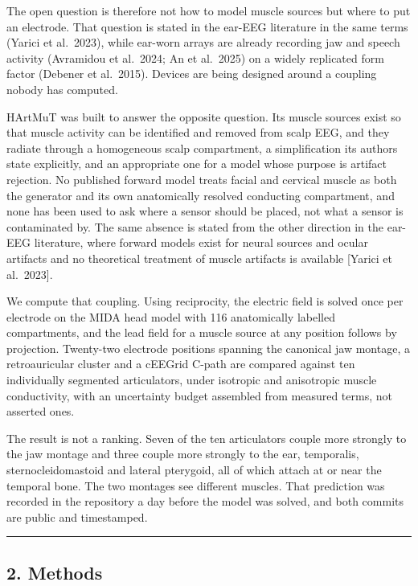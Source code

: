 \documentclass[
  11pt,
  a4paper,
]{article}
\newcounter{none} %
\begin{document}
The open question is therefore not how to model muscle sources but where to
put an electrode. That question is stated in the ear-EEG literature in the
same terms (Yarici et al.~2023), while ear-worn arrays are already recording
jaw and speech activity (Avramidou et al.~2024; An et al.~2025) on a widely
replicated form factor (Debener et al.~2015). Devices are being designed
around a coupling nobody has computed.

HArtMuT was built to answer the opposite question. Its muscle sources exist so
that muscle activity can be identified and removed from scalp EEG, and they
radiate through a homogeneous scalp compartment, a simplification its authors
state explicitly, and an appropriate one for a model whose purpose is artifact
rejection. No published forward model treats facial and cervical muscle as both
the generator and its own anatomically resolved conducting compartment, and none
has been used to ask where a sensor should be placed, not what a sensor is
contaminated by. The same absence is stated from the other direction in the
ear-EEG literature, where forward models exist for neural sources and ocular
artifacts and no theoretical treatment of muscle artifacts is available {[}Yarici
et al.~2023{]}.

We compute that coupling. Using reciprocity, the electric field is solved once
per electrode on the MIDA head model with 116 anatomically labelled
compartments, and the lead field for a muscle source at any position follows by
projection. Twenty-two electrode positions spanning the canonical jaw montage, a
retroauricular cluster and a cEEGrid C-path are compared against ten
individually segmented articulators, under isotropic and anisotropic muscle
conductivity, with an uncertainty budget assembled from measured terms, not
asserted ones.

The result is not a ranking. Seven of the ten articulators couple more strongly
to the jaw montage and three couple more strongly to the ear, temporalis,
sternocleidomastoid and lateral pterygoid, all of which attach at or near the
temporal bone. The two montages see different muscles. That prediction was
recorded in the repository a day before the model was solved, and both commits
are public and timestamped.

\begin{center}\rule{0.5\linewidth}{0.5pt}\end{center}

\subsection{2. Methods}\label{methods}
\end{document}
